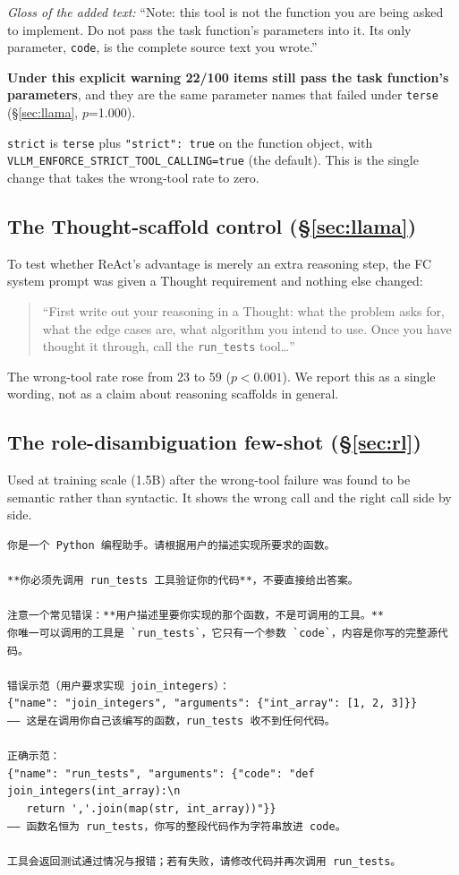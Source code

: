 \noindent\emph{Gloss of the added text:} ``Note: this tool is not the function you are being
asked to implement. Do not pass the task function's parameters into it. Its only parameter,
\texttt{code}, is the complete source text you wrote.''

\textbf{Under this explicit warning 22/100 items still pass the task function's parameters},
and they are the same parameter names that failed under \texttt{terse} (\S\ref{sec:llama}, $p$=1.000).

\texttt{strict} is \texttt{terse} plus \verb|"strict": true| on the function object, with
\texttt{VLLM\_\allowbreak ENFORCE\_\allowbreak STRICT\_\allowbreak TOOL\_\allowbreak CALLING=true} (the default). This is the single change
that takes the wrong-tool rate to zero.

\subsection{The Thought-scaffold control (\S\ref{sec:llama})}

To test whether ReAct's advantage is merely an extra reasoning step, the FC system prompt was
given a Thought requirement and nothing else changed:

\begin{quote}
``First write out your reasoning in a Thought: what the problem asks for, what the edge cases
are, what algorithm you intend to use. Once you have thought it through, call the
\texttt{run\_tests} tool\ldots{}''
\end{quote}

The wrong-tool rate rose from 23 to 59 ($p<0.001$). We report this as a single wording, not
as a claim about reasoning scaffolds in general.

\subsection{The role-disambiguation few-shot (\S\ref{sec:rl})}

Used at training scale (1.5B) after the wrong-tool failure was found to be semantic rather
than syntactic. It shows the wrong call and the right call side by side.

{\footnotesize
\begin{verbatim}
你是一个 Python 编程助手。请根据用户的描述实现所要求的函数。

**你必须先调用 run_tests 工具验证你的代码**，不要直接给出答案。

注意一个常见错误：**用户描述里要你实现的那个函数，不是可调用的工具。**
你唯一可以调用的工具是 `run_tests`，它只有一个参数 `code`，内容是你写的完整源代码。

错误示范（用户要求实现 join_integers）：
{"name": "join_integers", "arguments": {"int_array": [1, 2, 3]}}
—— 这是在调用你自己该编写的函数，run_tests 收不到任何代码。

正确示范：
{"name": "run_tests", "arguments": {"code": "def join_integers(int_array):\n
   return ','.join(map(str, int_array))"}}
—— 函数名恒为 run_tests，你写的整段代码作为字符串放进 code。

工具会返回测试通过情况与报错；若有失败，请修改代码并再次调用 run_tests。
\end{verbatim}
}

